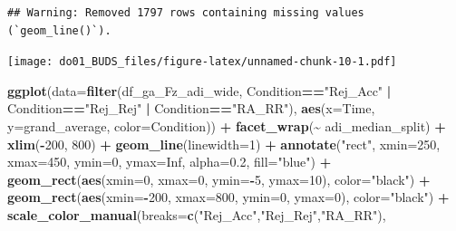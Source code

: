 \documentclass[
]{article}
\newenvironment{Shaded}{\begin{snugshade}}{\end{snugshade}}
\newcommand{\AttributeTok}[1]{\textcolor[rgb]{0.13,0.29,0.53}{#1}}
\newcommand{\ConstantTok}[1]{\textcolor[rgb]{0.56,0.35,0.01}{#1}}
\newcommand{\DecValTok}[1]{\textcolor[rgb]{0.00,0.00,0.81}{#1}}
\newcommand{\FloatTok}[1]{\textcolor[rgb]{0.00,0.00,0.81}{#1}}
\newcommand{\FunctionTok}[1]{\textcolor[rgb]{0.13,0.29,0.53}{\textbf{#1}}}
\newcommand{\NormalTok}[1]{#1}
\newcommand{\SpecialCharTok}[1]{\textcolor[rgb]{0.81,0.36,0.00}{\textbf{#1}}}
\newcommand{\StringTok}[1]{\textcolor[rgb]{0.31,0.60,0.02}{#1}}
\begin{document}
\begin{verbatim}
## Warning: Removed 1797 rows containing missing values (`geom_line()`).
\end{verbatim}

\texttt{[image: do01\_BUDS\_files/figure-latex/unnamed-chunk-10-1.pdf]}

\begin{Shaded}
\begin{Highlighting}[]
\FunctionTok{ggplot}\NormalTok{(}\AttributeTok{data=}\FunctionTok{filter}\NormalTok{(df\_ga\_Fz\_adi\_wide, Condition}\SpecialCharTok{==}\StringTok{"Rej\_Acc"} \SpecialCharTok{|}\NormalTok{ Condition}\SpecialCharTok{==}\StringTok{"Rej\_Rej"} \SpecialCharTok{|}\NormalTok{ Condition}\SpecialCharTok{==}\StringTok{"RA\_RR"}\NormalTok{), }\FunctionTok{aes}\NormalTok{(}\AttributeTok{x=}\NormalTok{Time, }\AttributeTok{y=}\NormalTok{grand\_average, }\AttributeTok{color=}\NormalTok{Condition)) }\SpecialCharTok{+}
  \FunctionTok{facet\_wrap}\NormalTok{(}\SpecialCharTok{\textasciitilde{}}\NormalTok{ adi\_median\_split) }\SpecialCharTok{+}
  \FunctionTok{xlim}\NormalTok{(}\SpecialCharTok{{-}}\DecValTok{200}\NormalTok{, }\DecValTok{800}\NormalTok{) }\SpecialCharTok{+}
  \FunctionTok{geom\_line}\NormalTok{(}\AttributeTok{linewidth=}\DecValTok{1}\NormalTok{) }\SpecialCharTok{+}
  \FunctionTok{annotate}\NormalTok{(}\StringTok{"rect"}\NormalTok{, }\AttributeTok{xmin=}\DecValTok{250}\NormalTok{, }\AttributeTok{xmax=}\DecValTok{450}\NormalTok{, }\AttributeTok{ymin=}\DecValTok{0}\NormalTok{, }\AttributeTok{ymax=}\ConstantTok{Inf}\NormalTok{, }\AttributeTok{alpha=}\FloatTok{0.2}\NormalTok{, }\AttributeTok{fill=}\StringTok{"blue"}\NormalTok{) }\SpecialCharTok{+}
  \FunctionTok{geom\_rect}\NormalTok{(}\FunctionTok{aes}\NormalTok{(}\AttributeTok{xmin=}\DecValTok{0}\NormalTok{, }\AttributeTok{xmax=}\DecValTok{0}\NormalTok{, }\AttributeTok{ymin=}\SpecialCharTok{{-}}\DecValTok{5}\NormalTok{, }\AttributeTok{ymax=}\DecValTok{10}\NormalTok{), }\AttributeTok{color=}\StringTok{"black"}\NormalTok{) }\SpecialCharTok{+}
  \FunctionTok{geom\_rect}\NormalTok{(}\FunctionTok{aes}\NormalTok{(}\AttributeTok{xmin=}\SpecialCharTok{{-}}\DecValTok{200}\NormalTok{, }\AttributeTok{xmax=}\DecValTok{800}\NormalTok{, }\AttributeTok{ymin=}\DecValTok{0}\NormalTok{, }\AttributeTok{ymax=}\DecValTok{0}\NormalTok{), }\AttributeTok{color=}\StringTok{"black"}\NormalTok{) }\SpecialCharTok{+}
  \FunctionTok{scale\_color\_manual}\NormalTok{(}\AttributeTok{breaks=}\FunctionTok{c}\NormalTok{(}\StringTok{"Rej\_Acc"}\NormalTok{,}\StringTok{"Rej\_Rej"}\NormalTok{,}\StringTok{"RA\_RR"}\NormalTok{),}

\end{Highlighting}
\end{Shaded}
\end{document}
